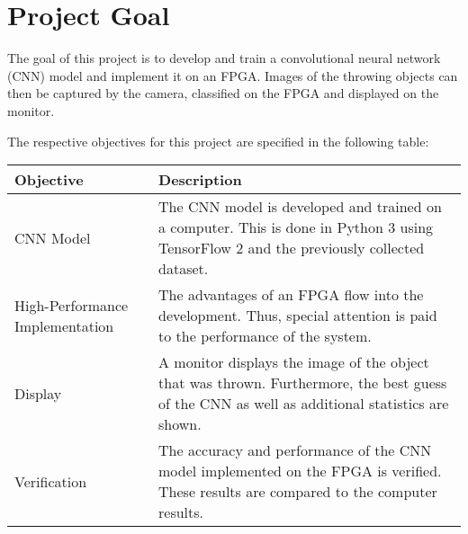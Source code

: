 \chapter{Project Goal}
\label{ch:project_goal}

The goal of this project is to develop and train a convolutional neural network (CNN) model and implement it on an FPGA.
Images of the throwing objects can then be captured by the camera, classified on the FPGA and displayed on the monitor.

The respective objectives for this project are specified in the following table:\\

\begin{tabularx}{\textwidth}{L{3.05cm}X}
  \toprule
  \textbf{Objective} & \textbf{Description} \\
  \midrule
  CNN Model & The CNN model is developed and trained on a computer. This is done in Python 3 using TensorFlow 2 and the previously collected dataset. \\
  \midrule
  High-Performance Implementation & The advantages of an FPGA flow into the development. Thus, special attention is paid to the performance of the system. \\
  \midrule
  Display & A monitor displays the image of the object that was thrown. Furthermore, the best guess of the CNN as well as additional statistics are shown. \\
  \midrule
  Verification & The accuracy and performance of the CNN model implemented on the FPGA is verified. These results are compared to the computer results. \\
  \bottomrule
\end{tabularx}
